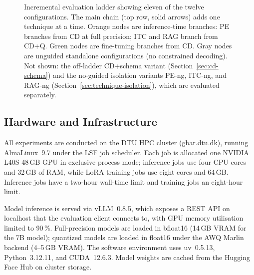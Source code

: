 \begin{figure}[ht]
{%
}
\caption{Incremental evaluation ladder showing eleven of the twelve
configurations. The main chain (top row, solid arrows) adds one technique at a
time. Orange nodes are inference-time branches: PE branches from CD at full
precision; ITC and RAG branch from CD+Q\@.
Green nodes are fine-tuning branches from CD\@.
Gray nodes are unguided standalone configurations (no constrained decoding).
Not shown: the off-ladder CD+schema variant (Section~\ref{sec:cd-schema}) and
the no-guided isolation variants PE-ng, ITC-ng, and RAG-ng
(Section~\ref{sec:technique-isolation}), which are evaluated separately.}
\label{fig:eval-ladder}
\end{figure}

\subsection{Hardware and Infrastructure}

All experiments are conducted on the DTU HPC cluster
(gbar.dtu.dk), running AlmaLinux~9.7 under the LSF job
scheduler. Each job is allocated one NVIDIA L40S 48\,GB
GPU in exclusive process mode; inference jobs use four CPU
cores and 32\,GB of RAM, while LoRA training jobs use eight
cores and 64\,GB. Inference jobs have a two-hour wall-time
limit and training jobs an eight-hour limit.

Model inference is served via vLLM~0.8.5, which exposes a
REST API on localhost that the evaluation client connects to,
with GPU memory utilisation limited to 90\,\%. Full-precision models are loaded in bfloat16 (14\,GB
VRAM for the 7B model); quantized models are loaded in float16
under the AWQ Marlin backend (4--5\,GB VRAM). The software
environment uses uv~0.5.13, Python~3.12.11, and CUDA~12.6.3.
Model weights are cached from the Hugging Face Hub on cluster
storage.

